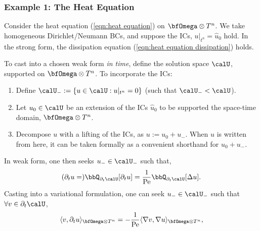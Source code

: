 \subsubsection{Example 1: The Heat Equation}
    \begin{example}
        Consider the heat equation (\ref{eqn:heat equation}) on $\bfOmega\otimes T^{n}$. We take homogeneous Dirichlet/Neumann BCs, and suppose the ICs, $u|_{t^{n}}  =  \widehat{u}_{0}$ hold. In the strong form, the dissipation equation (\ref{eqn:heat equation dissipation}) holds.

        To cast into a chosen weak form \emph{in time}, define the solution space $\calU$, supported on $\bfOmega\otimes T^{n}$. To incorporate the ICs:
        \begin{enumerate}
            \item  Define $\calU_{-}  :=  \{u  \in  \calU  :  u|_{t^{n}}  =  0\}$ (such that $\calU_{-}  <  \calU$).
            \item  Let $u_{0}  \in  \calU$ be an extension of the ICs $\widehat{u}_{0}$ to be supported the space-time domain, $\bfOmega\otimes T^{n}$.
            \item  Decompose $u$ with a lifting of the ICs, as $u  :=  u_{0} + u_{-}$. When $u$ is written from here, it can be taken formally as a convenient shorthand for $u_{0} + u_{-}$.
        \end{enumerate}
        In weak form, one then seeks $u_{-}  \in  \calU_{-}$ such that,
        \begin{equation}
            (\partial_{t}u  =)  \bbQ_{\partial_{t}\calU}[\partial_{t}u]  =  \frac{1}{\rmPe}\bbQ_{\partial_{t}\calU}[\Delta u].
        \end{equation}
        Casting into a variational formulation, one can seek $u_{-}  \in  \calU_{-}$ such that $\forall  v  \in  \partial_{t}\calU$,
        \begin{equation}\label{eqn:heat equation weak form}
            \langle v, \partial_{t}u\rangle_{\bfOmega\otimes T^{n}}  =   - \frac{1}{\rmPe}\langle\nabla v, \nabla u\rangle_{\bfOmega\otimes T^{n}},
        \end{equation}
        

\end{example}
